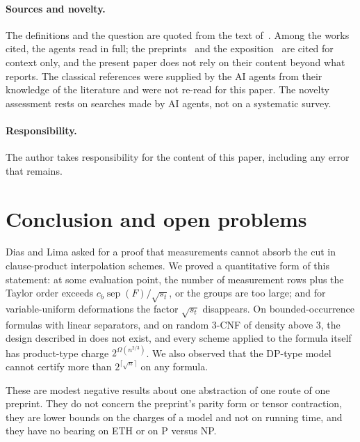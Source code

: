 \documentclass[11pt,a4paper]{article}
\theoremstyle{definition}
\theoremstyle{remark}
\newcommand{\sep}{\operatorname{sep}}
\begin{document}
\paragraph{Sources and novelty.} The definitions and the question are quoted from the text
of~\cite{DL}. Among the works cited, the agents read \cite{DL} in full; the
preprints~\cite{OpenAI,Claude} and the exposition~\cite{ODonnell} are cited for context
only, and the present paper does not rely on their content beyond what~\cite{DL} reports.
The classical references were supplied by the AI agents from their knowledge of the
literature and were not re-read for this paper. The novelty assessment rests on searches made by AI
agents, not on a systematic survey.

\paragraph{Responsibility.} The author takes responsibility for the content of this paper,
including any error that remains.

\section{Conclusion and open problems}\label{sec:concl}

Dias and Lima asked for a proof that measurements cannot absorb the cut in clause-product
interpolation schemes. We proved a quantitative form of this statement: at some evaluation
point, the number of measurement rows plus the Taylor order exceeds
$c_b\sep(F)/\sqrt{s_t}$, or the groups are too large; and for variable-uniform deformations
the factor $\sqrt{s_t}$ disappears. On bounded-occurrence formulas with linear separators,
and on random 3-CNF of density above $3$, the design described in \cite[Section~9]{DL} does
not exist, and every scheme applied to the formula itself has product-type charge
$2^{\Omega(n^{2/3})}$. We also observed that the DP-type model cannot certify more than
$2^{\lceil\sqrt n\rceil}$ on any formula.

These are modest negative results about one abstraction of one route of one preprint. They
do not concern the preprint's parity form or tensor contraction, they are lower bounds on
the charges of a model and not on running time, and they have no bearing on ETH or on
P versus NP.
\end{document}
